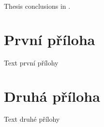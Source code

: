\documentclass[
  field=ainfk,
  biblatex,
  glossaries,
  index
]{kidiplom}
\begin{document}
\begin{kiconclusions}[english]
Thesis conclusions in .
\end{kiconclusions}

\appendix

\section{První příloha}
Text první přílohy

\section{Druhá příloha}
Text druhé přílohy


\printglossary


\nocite{*}

%
%

\printindex
\end{document}
